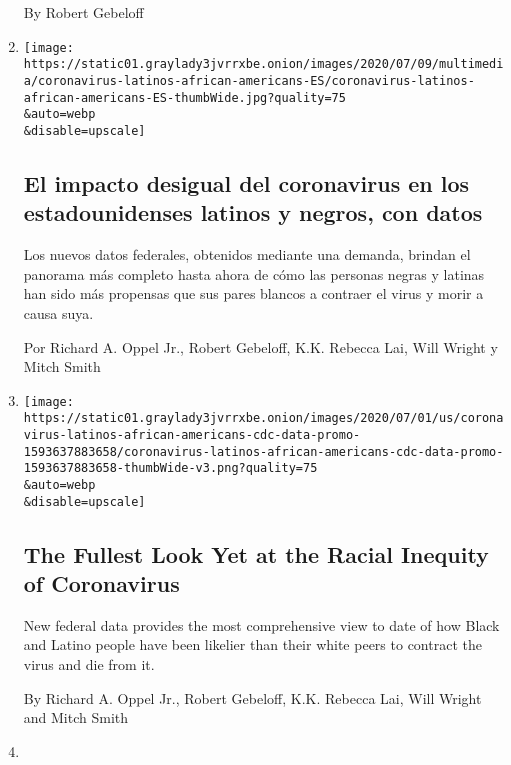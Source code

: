 \begin{enumerate}
  By Robert Gebeloff
\item
  \href{/es/interactive/2020/07/09/espanol/mundo/coronavirus-latinos-africanoamericanos-datos.html}{}

  \texttt{[image: https://static01.graylady3jvrrxbe.onion/images/2020/07/09/multimedia/coronavirus-latinos-african-americans-ES/coronavirus-latinos-african-americans-ES-thumbWide.jpg?quality=75\\\&auto=webp\\\&disable=upscale]}

  \hypertarget{el-impacto-desigual-del-coronavirus-en-los-estadounidenses-latinos-y-negros-con-datos}{%
  \subsection{El impacto desigual del coronavirus en los estadounidenses
  latinos y negros, con
  datos}\label{el-impacto-desigual-del-coronavirus-en-los-estadounidenses-latinos-y-negros-con-datos}}

  Los nuevos datos federales, obtenidos mediante una demanda, brindan el
  panorama más completo hasta ahora de cómo las personas negras y
  latinas han sido más propensas que sus pares blancos a contraer el
  virus y morir a causa suya.

  Por Richard A. Oppel Jr., Robert Gebeloff, K.K. Rebecca Lai, Will
  Wright y Mitch Smith
\item
  \href{/interactive/2020/07/05/us/coronavirus-latinos-african-americans-cdc-data.html}{}

  \texttt{[image: https://static01.graylady3jvrrxbe.onion/images/2020/07/01/us/coronavirus-latinos-african-americans-cdc-data-promo-1593637883658/coronavirus-latinos-african-americans-cdc-data-promo-1593637883658-thumbWide-v3.png?quality=75\\\&auto=webp\\\&disable=upscale]}

  \hypertarget{the-fullest-look-yet-at-the-racial-inequity-of-coronavirus}{%
  \subsection{The Fullest Look Yet at the Racial Inequity of
  Coronavirus}\label{the-fullest-look-yet-at-the-racial-inequity-of-coronavirus}}

  New federal data provides the most comprehensive view to date of how
  Black and Latino people have been likelier than their white peers to
  contract the virus and die from it.

  By Richard A. Oppel Jr., Robert Gebeloff, K.K. Rebecca Lai, Will
  Wright and Mitch Smith
\item
  \href{/2020/05/25/us/politics/coronavirus-red-blue-states.html}{}


\end{enumerate}

